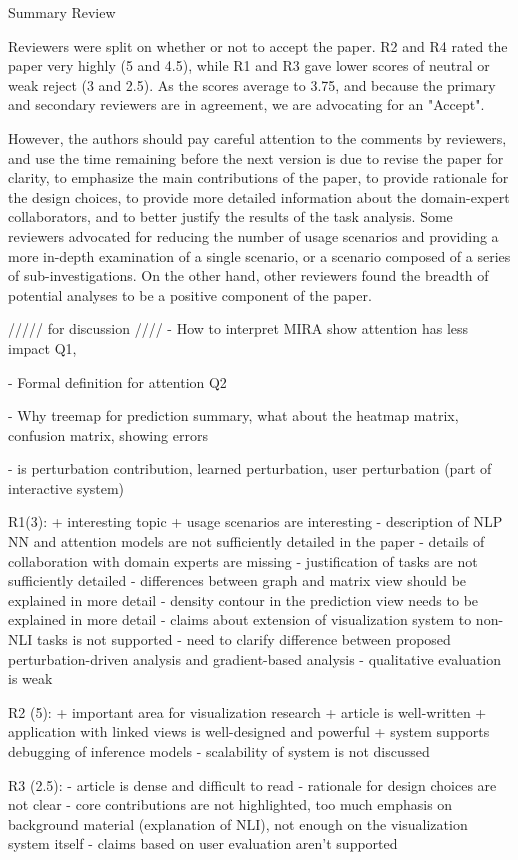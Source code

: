 Summary Review

Reviewers were split on whether or not to accept the paper. R2 and R4 rated the paper very highly (5 and 4.5), while R1 and R3 gave lower scores of neutral or weak reject (3 and 2.5). As the scores average to 3.75, and because the primary and secondary reviewers are in agreement, we are advocating for an "Accept".

However, the authors should pay careful attention to the comments by reviewers, and use the time remaining before the next version is due to revise the paper for clarity, to emphasize the main contributions of the paper, to provide rationale for the design choices, to provide more detailed information about the domain-expert collaborators, and to better justify the results of the task analysis. Some reviewers advocated for reducing the number of usage scenarios and providing a more in-depth examination of a single scenario, or a scenario composed of a series of sub-investigations. On the other hand, other reviewers found the breadth of potential analyses to be a positive component of the paper.

///// for discussion ////
- How to interpret MIRA show attention has less impact
Q1,

- Formal definition for attention
Q2

- Why treemap for prediction summary, what about the heatmap matrix, confusion matrix, showing errors

- is perturbation contribution, learned perturbation, user perturbation (part of interactive system)

R1(3):
+ interesting topic
+ usage scenarios are interesting
- description of NLP NN and attention models are not sufficiently detailed in the paper
- details of collaboration with domain experts are missing
- justification of tasks are not sufficiently detailed
- differences between graph and matrix view should be explained in more detail
- density contour in the prediction view needs to be explained in more detail
- claims about extension of visualization system to non-NLI tasks is not supported
- need to clarify difference between proposed perturbation-driven analysis and gradient-based analysis
- qualitative evaluation is weak

R2 (5):
+ important area for visualization research
+ article is well-written
+ application with linked views is well-designed and powerful
+ system supports debugging of inference models
- scalability of system is not discussed

R3 (2.5):
- article is dense and difficult to read
- rationale for design choices are not clear
- core contributions are not highlighted, too much emphasis on background material (explanation of NLI), not enough on the visualization system itself
- claims based on user evaluation aren't supported

